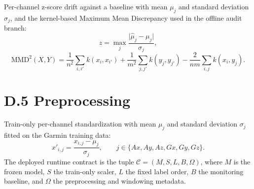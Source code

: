 \noindent Per-channel z-score drift against a baseline with mean \(\mu_j\) and standard deviation \(\sigma_j\), and the kernel-based Maximum Mean Discrepancy used in the offline audit branch:
\[
z=\max_{j}\frac{\lvert\hat{\mu}_j-\mu_j\rvert}{\sigma_j},
\]
\[
\mathrm{MMD}^2(X,Y)=\frac{1}{n^2}\sum_{i,i'}k(x_i,x_{i'})+\frac{1}{m^2}\sum_{j,j'}k(y_j,y_{j'})-\frac{2}{nm}\sum_{i,j}k(x_i,y_j).
\]

\section*{D.5 Preprocessing}

\noindent Train-only per-channel standardization with mean \(\mu_j\) and standard deviation \(\sigma_j\) fitted on the Garmin training data:
\[
x'_{i,j}=\frac{x_{i,j}-\mu_j}{\sigma_j},\qquad j\in\{Ax,Ay,Az,Gx,Gy,Gz\}.
\]
The deployed runtime contract is the tuple \(\mathcal{C}=(M,S,L,B,\Omega)\), where \(M\) is the frozen model, \(S\) the train-only scaler, \(L\) the fixed label order, \(B\) the monitoring baseline, and \(\Omega\) the preprocessing and windowing metadata.
